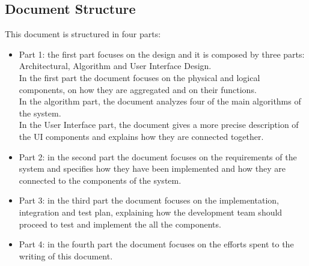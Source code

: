 \subsection{Document Structure}
This document is structured in four parts:
\begin{itemize}
\item
Part 1: the first part focuses on the design and it is composed by three parts: Architectural, Algorithm and User Interface Design.\\
In the first part the document focuses on the physical and logical components, on how they are aggregated and on their functions.\\
In the algorithm part, the document analyzes four of the main algorithms of the system.\\
In the User Interface part, the document gives a more precise description of the UI components and explains how they are connected together.
\item
Part 2: in the second part the document focuses on the requirements of the system and specifies how they have been implemented and how they are connected to the components of the system.
\item
Part 3: in the third part the document focuses on the implementation, integration and test plan, explaining how the development team should proceed to test and implement the all the components.
\item
Part 4: in the fourth part the document focuses on the efforts spent to the writing of this document.
\end{itemize}